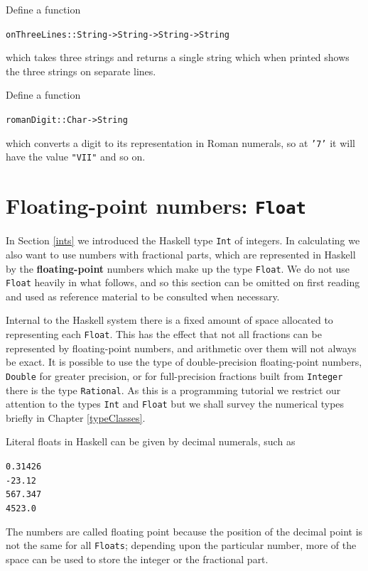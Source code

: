 \begin{exercises}

\item Define a function 
\begin{alltt}
onThreeLines :: String -> String -> String -> String
\end{alltt}
which takes three strings and returns a single string which when printed
shows the three strings on separate lines.


\item Define a function
\begin{alltt}
romanDigit :: Char -> String
\end{alltt}
which converts a digit to its representation in Roman numerals, so 
at \texttt{'7'} it will have the value \texttt{"VII"} and so on.

\end{exercises}



\section{Floating-point numbers: \texttt{Float}}
\label{float}

In Section \ref{ints} we introduced the Haskell type \texttt{Int} of integers.
In calculating we also want to use numbers with fractional parts, which
are represented in Haskell by the \textbf{floating-point} numbers which
make up the type \texttt{Float}. We do not use \texttt{Float} heavily in
what follows, and so this section can be omitted on first reading and
used as reference material to be consulted when necessary.

Internal to the Haskell system there is a fixed amount of space allocated to
representing each \texttt{Float}. This has the effect that
not all fractions can be
represented by floating-point numbers, and
arithmetic over them will not always be exact. It is possible to use the
type of double-precision floating-point numbers, \texttt{Double} for greater
precision, or for full-precision fractions built from \texttt{Integer} there is the
type \texttt{Rational}. As 
this is a
programming tutorial we restrict our attention to the types \texttt{Int} and 
\texttt{Float} but we shall survey the numerical types briefly in Chapter
\ref{typeClasses}.

Literal floats in
Haskell can be given by decimal numerals, such as
\begin{alltt}
0.31426
-23.12
567.347
4523.0
\end{alltt}
The numbers are
called floating point because the position of the decimal point is not the
same for all \texttt{Floats};
depending upon the particular number, more of the space can be used to store
the integer or the fractional part.

